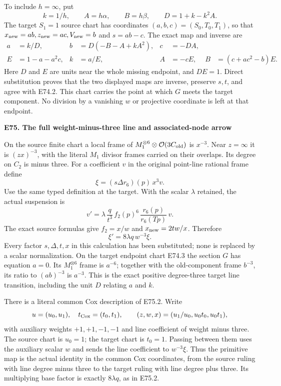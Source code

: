To include \(h=\infty\), put
\[
       k=1/h,\qquad A=h\alpha,\qquad B=h\beta,
       \qquad D=1+k-k^2A.
\]
The target \(S_1=1\) source chart has coordinates
\((a,b,c)=(S_0,T_0,T_1)\), so that
\(x_{\rm new}=ab,z_{\rm new}=ac,V_{\rm new}=b\)
and \(s=ab-c\). The exact map and inverse are
\[
\begin{aligned}
 a&=k/D,& b&=D(-B-A+kA^2),& c&=-DA,\\
 E&=1-a-a^2c,&
 k&=a/E,& A&=-cE,& B&=(c+ac^2-b)E .
\end{aligned}                                  \tag{E74.3}
\]
Here \(D\) and \(E\) are units near the whole missing endpoint,
and \(DE=1\). Direct substitution proves that the two displayed
maps are inverse, preserve \(s,t\), and agree with E74.2.
This chart carries the point at which \(G\) meets the target
component. No division by a vanishing \(w\) or projective
coordinate is left at that endpoint.

\par

\medskip\noindent\textbf{E75. The full weight-minus-three line and associated-node arrow}

\par\nobreak

On the source finite chart a local frame of
\(M_1^{\otimes6}\otimes\mathcal O(3C_{\rm old})\)
is \(x^{-3}\). Near \(z=\infty\) it is
\((zx)^{-3}\), with the literal \(M_1\) divisor frames
carried on their overlaps. Its degree on \(C_2\) is minus
three. For a coefficient \(v\) in the original point-line
rational frame define
\[
             \xi=(s\Delta r_6)(p)\,x^3v.        \tag{E75.1}
\]
Use the same typed definition at the target. With the scalar
\(\lambda\) retained, the actual suspension is
\[
 v'=\lambda\,\frac q{t^3}\,
       f_2(p)^6\,\frac{r_6(p)}{r_6(Tp)}\,v .
\]
The exact source formulas give
\(f_2=x/w\) and \(x_{\rm new}=2tw/x\). Therefore
\[
                        \xi'=8\lambda q\,w^{-3}\xi .
 \tag{E75.2}
\]
Every factor \(s,\Delta,t,x\) in this calculation has been
substituted; none is replaced by a scalar normalization.
On the target endpoint chart E74.3 the section \(G\) has
equation \(a=0\). Its \(M_1^{\otimes6}\) frame is \(a^{-6}\);
together with the old-component frame \(b^{-3}\), its ratio
to \((ab)^{-3}\) is \(a^{-3}\). This is the exact positive
degree-three target line transition, including the unit
\(D\) relating \(a\) and \(k\).

There is a literal common Cox description of E75.2. Write
\[
 u=(u_0,u_1),\quad t_{\rm Cox}=(t_0,t_1),\qquad
 (z,w,x)=(u_1/u_0,u_0t_0,u_0t_1),
\]
with auxiliary weights \(+1,+1,-1,-1\) and line coefficient
of weight minus three. The source chart is \(u_0=1\);
the target chart is \(t_0=1\). Passing between them uses
the auxiliary scalar \(w\) and sends the line coefficient
to \(w^{-3}\xi\). Thus the primitive map is the actual
identity in the common Cox coordinates, from the source
ruling with line degree minus three to the target ruling
with line degree plus three. Its multiplying base factor
is exactly \(8\lambda q\), as in E75.2.

